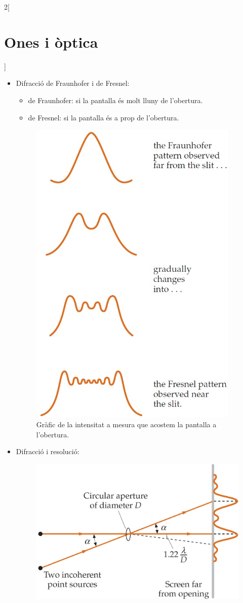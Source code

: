 \documentclass[class=article,10pt,crop=false]{standalone}
\begin{document}
\begin{multicols}{2}[\section{Ones i òptica}]
\begin{itemize}
\begin{itemize}
\begin{figure}[ht]
\end{figure}
        \item Difracció de Fraunhofer i de Fresnel:
        \begin{itemize}
            \item de Fraunhofer: si la pantalla és molt lluny de l'obertura.
            \item de Fresnel: si la pantalla és a prop de l'obertura.
        \end{itemize}
        \begin{figure}[ht]
    \includegraphics[width=10cm]{Physics/1st/Ones_i_optica/Imatges/fraun.jpg} 
    \caption{Gràfic de la intensitat a mesura que acostem la pantalla a l'obertura.}
\end{figure}
    \item Difracció i resolució:\newline
    \begin{figure}[ht]
    \includegraphics[width=\linewidth]{Physics/1st/Ones_i_optica/Imatges/reso.jpg} 

\end{figure}
\end{itemize}
\end{itemize}
\end{multicols}
\end{document}
